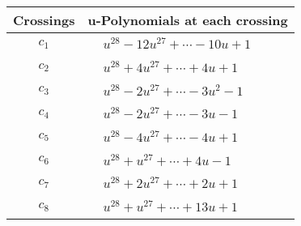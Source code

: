 \documentclass[1p]{elsarticle_modified}
\theoremstyle{definition}
\begin{document}
\begin{tabular}{m{50pt}|m{274pt}}
Crossings & \hspace{64pt}u-Polynomials at each crossing \\
\hline $$\begin{aligned}c_{1}\end{aligned}$$&$\begin{aligned}
&u^{28}-12 u^{27}+\cdots-10 u+1
\end{aligned}$\\
\hline $$\begin{aligned}c_{2}\end{aligned}$$&$\begin{aligned}
&u^{28}+4 u^{27}+\cdots+4 u+1
\end{aligned}$\\
\hline $$\begin{aligned}c_{3}\end{aligned}$$&$\begin{aligned}
&u^{28}-2 u^{27}+\cdots-3 u^2-1
\end{aligned}$\\
\hline $$\begin{aligned}c_{4}\end{aligned}$$&$\begin{aligned}
&u^{28}-2 u^{27}+\cdots-3 u-1
\end{aligned}$\\
\hline $$\begin{aligned}c_{5}\end{aligned}$$&$\begin{aligned}
&u^{28}-4 u^{27}+\cdots-4 u+1
\end{aligned}$\\
\hline $$\begin{aligned}c_{6}\end{aligned}$$&$\begin{aligned}
&u^{28}+u^{27}+\cdots+4 u-1
\end{aligned}$\\
\hline $$\begin{aligned}c_{7}\end{aligned}$$&$\begin{aligned}
&u^{28}+2 u^{27}+\cdots+2 u+1
\end{aligned}$\\
\hline $$\begin{aligned}c_{8}\end{aligned}$$&$\begin{aligned}
&u^{28}+u^{27}+\cdots+13 u+1
\end{aligned}$\\

\end{tabular}
\end{document}
